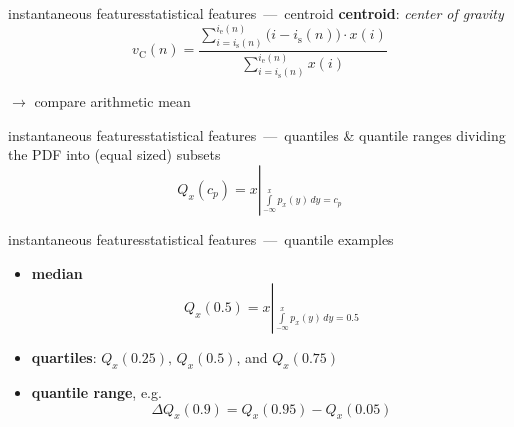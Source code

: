         \begin{frame}{instantaneous features}{statistical features~---~centroid}
            \textbf{centroid}: \textit{center of gravity}
			\begin{equation*}\label{eq:centroid}
				v_{\mathrm{C}}(n) = \frac{\sum\limits_{i=i_{\mathrm{s}}(n)}^{i_{\mathrm{e}}(n)}{\big(i-i_{\mathrm{s}}(n)\big)\cdot x(i)}}{\sum\limits_{i=i_{\mathrm{s}}(n)}^{i_{\mathrm{e}}(n)}{x(i)}} 
			\end{equation*}
            
            \pause
            
            $\rightarrow$ compare arithmetic mean
        \end{frame}
		\begin{frame}{instantaneous features}{statistical features~---~quantiles \& quantile ranges}
			dividing the PDF into (equal sized) subsets
			\begin{equation*}
				Q_x(c_p) = x\left|_{\int\limits_{-\infty}^{x}{p_x(y)\, dy} = c_p} \right.
			\end{equation*}
        \end{frame}
		\begin{frame}{instantaneous features}{statistical features~---~quantile examples}
			\begin{itemize}
				\item	\textbf{median}
						\pause
						\begin{equation*}\label{eq:median}
							Q_x(0.5) = x\left|_{\int\limits_{-\infty}^{x}{p_x(y)\, dy} = 0.5} \right.
						\end{equation*}
				\pause
				\item	\textbf{quartiles}: $Q_x(0.25),\, Q_x(0.5)$, and $Q_x(0.75)$
				\pause
				\item	\textbf{quantile range}, e.g.
						\begin{equation*}
							\Delta Q_x(0.9) = Q_x(0.95)-Q_x(0.05)
						\end{equation*}
			\end{itemize}
        \end{frame}
